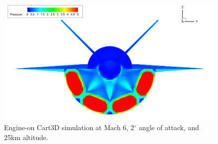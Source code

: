 		
		\begin{figure}[ht]
			\centering
			\includegraphics[width=0.9\linewidth]{figures/3_vehicle_design/EngineOn}
			\caption{Engine-on Cart3D simulation at Mach 6, 2$^\circ$ angle of attack, and 25km altitude.}
			\label{fig:EngineOn}
		\end{figure}
		
